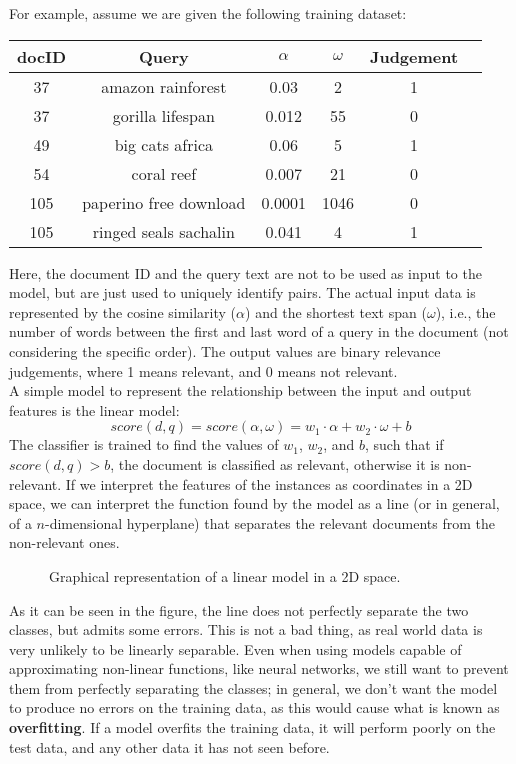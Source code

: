 For example, assume we are given the following training dataset:
\begin{table}[H]
    \centering
    \begin{tabular}{|c|c||c|c|c|c|}
    \hline
    docID & Query & $\alpha$ & $\omega$ & Judgement \\
    \hline
    37 & amazon rainforest & 0.03 & 2 & 1 \\
    37 & gorilla lifespan & 0.012 & 55 & 0 \\
    49 & big cats africa & 0.06 & 5 & 1 \\
    54 & coral reef & 0.007 & 21 & 0 \\
    105 & paperino free download & 0.0001 & 1046 & 0 \\
    105 & ringed seals sachalin & 0.041 & 4 & 1 \\
    \hline
    \end{tabular} 
\end{table} 
Here, the document ID and the query text are not to be used as input to the model, but are just used to uniquely identify pairs. The actual input data is represented by the cosine similarity ($\alpha$) and the shortest text span ($\omega$), i.e., the number of words between the first and last word of a query in the document (not considering the specific order). The output values are binary relevance judgements, where 1 means relevant, and 0 means not relevant. \\
A simple model to represent the relationship between the input and output features is the linear model:
\begin{equation*}
    \textit{score}(d,q) = \textit{score}(\alpha, \omega) = w_1 \cdot \alpha + w_2 \cdot \omega + b
\end{equation*}
The classifier is trained to find the values of $w_1$, $w_2$, and $b$, such that if $\textit{score}(d,q) > b$, the document is classified as relevant, otherwise it is non-relevant. If we interpret the features of the instances as coordinates in a 2D space, we can interpret the function found by the model as a line (or in general, of a $n$-dimensional hyperplane) that separates the relevant documents from the non-relevant ones.
\begin{figure}[H]
    \centering
    
    \caption{Graphical representation of a linear model in a 2D space.}
\end{figure}
As it can be seen in the figure, the line does not perfectly separate the two classes, but admits some errors. This is not a bad thing, as real world data is very unlikely to be linearly separable. Even when using models capable of approximating non-linear functions, like neural networks, we still want to prevent them from perfectly separating the classes; in general, we don't want the model to produce no errors on the training data, as this would cause what is known as \textbf{overfitting}. If a model overfits the training data, it will perform poorly on the test data, and any other data it has not seen before.

